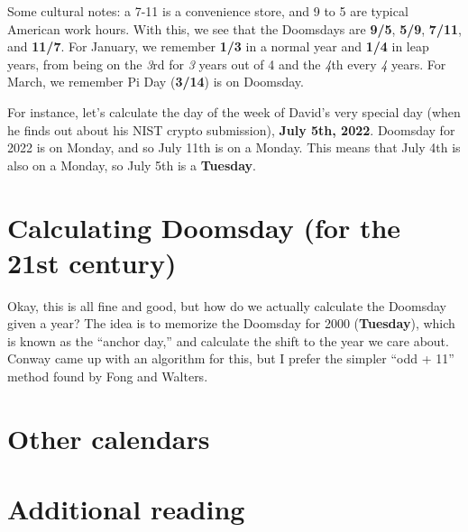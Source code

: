 \documentclass[12pt,letterpaper]{article}
\begin{document}
Some cultural notes: a 7-11 is a convenience store, and 9 to 5 are typical American work hours. With this, we see that the Doomsdays are \textbf{9/5}, \textbf{5/9}, \textbf{7/11}, and \textbf{11/7}. For January, we remember \textbf{1/3} in a normal year and \textbf{1/4} in leap years, from being on the \textit 3rd for \textit{3} years out of 4 and the \textit 4th every \textit 4 years. For March, we remember Pi Day (\textbf{3/14}) is on Doomsday. 

For instance, let's calculate the day of the week of David's very special day (when he finds out about his NIST crypto submission), \textbf{July 5th, 2022}. Doomsday for 2022 is on Monday, and so July 11th is on a Monday. This means that July 4th is also on a Monday, so July 5th is a \textbf{Tuesday}. 

\section{Calculating Doomsday (for the 21st century)}

Okay, this is all fine and good, but how do we actually calculate the Doomsday given a year? The idea is to memorize the Doomsday for 2000 (\textbf{Tuesday}), which is known as the ``anchor day,'' and calculate the shift to the year we care about. Conway came up with an algorithm for this, but I prefer the simpler ``odd + 11'' method found by Fong and Walters.  

\section{Other calendars}\label{sec:non-gregorian}

\section{Additional reading}
\end{document}
